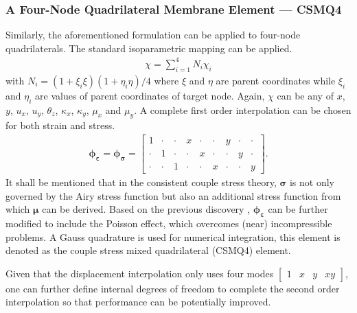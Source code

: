 \documentclass[3p,sort&compress,11pt,fleqn,review]{elsarticle}
\newcommand*{\mb}[1]{\boldsymbol{#1}}
\begin{document}
\subsubsection{A Four-Node Quadrilateral Membrane Element --- CSMQ4}
Similarly, the aforementioned formulation can be applied to four-node quadrilaterals. The standard isoparametric mapping can be applied.
\begin{gather}
\chi=\sum_{i=1}^4N_i\chi_i
\end{gather}
with $N_i=\left(1+\xi_i\xi\right)\left(1+\eta_i\eta\right)/4$ where $\xi$ and $\eta$ are parent coordinates while $\xi_i$ and $\eta_i$ are values of parent coordinates of target node. Again, $\chi$ can be any of $x$, $y$, $u_x$, $u_y$, $\theta_z$, $\kappa_x$, $\kappa_y$, $\mu_x$ and $\mu_y$. A complete first order interpolation can be chosen for both strain and stress.
\begin{gather}
\mb{\phi}_{\mb{\varepsilon}}=\mb{\phi}_{\mb{\sigma}}=\begin{bmatrix}
1&\cdot&\cdot&x&\cdot&\cdot&y&\cdot&\cdot\\
\cdot&1&\cdot&\cdot&x&\cdot&\cdot&y&\cdot\\
\cdot&\cdot&1&\cdot&\cdot&x&\cdot&\cdot&y
\end{bmatrix}.
\end{gather}
It shall be mentioned that in the consistent couple stress theory, $\mb{\sigma}$ is not only governed by the Airy stress function but also an additional stress function \citep{Hadjesfandiari2011} from which $\mb{\mu}$ can be derived. Based on the previous discovery \citep{Chang2019}, $\mb{\phi}_{\mb{\varepsilon}}$ can be further modified to include the Poisson effect, which overcomes (near) incompressible problems. A  Gauss quadrature is used for numerical integration, this element is denoted as the couple stress mixed quadrilateral (CSMQ4) element.

Given that the displacement interpolation only uses four modes $\begin{bmatrix}
1&x&y&xy
\end{bmatrix}$, one can further define internal degrees of freedom to complete the second order interpolation so that performance can be potentially improved.
\end{document}
